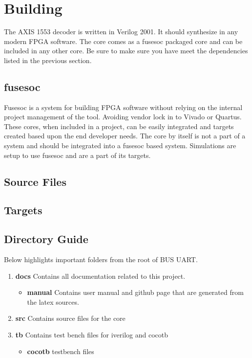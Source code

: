 \section{Building}

\par
The AXIS 1553 decoder is written in Verilog 2001. It should synthesize in any modern FPGA software. The core comes as a fusesoc packaged core and can be
included in any other core. Be sure to make sure you have meet the dependencies listed in the previous section.

\subsection{fusesoc}
\par
Fusesoc is a system for building FPGA software without relying on the internal project management of the tool. Avoiding vendor lock in to Vivado or Quartus.
These cores, when included in a project, can be easily integrated and targets created based upon the end developer needs. The core by itself is not a part of
a system and should be integrated into a fusesoc based system. Simulations are setup to use fusesoc and are a part of its targets.

\subsection{Source Files}



\subsection{Targets}



\subsection{Directory Guide}

\par
Below highlights important folders from the root of BUS UART.

\begin{enumerate}
  \item \textbf{docs} Contains all documentation related to this project.
    \begin{itemize}
      \item \textbf{manual} Contains user manual and github page that are generated from the latex sources.
    \end{itemize}
  \item \textbf{src} Contains source files for the core
  \item \textbf{tb} Contains test bench files for iverilog and cocotb
    \begin{itemize}
      \item \textbf{cocotb} testbench files
    \end{itemize}
\end{enumerate}

